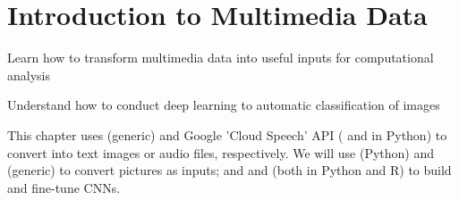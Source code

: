 \chapter{Introduction to Multimedia Data}
\label{chap:image}

\begin{abstract}{Abstract}
Digitally collected data often does not only contain texts, but also audio, images and videos. Instead of using only textual features as we did in previous chapters, we could as well use, for instance, pixel values
to analyse images. First, we will see how to use existing libraries, commercial services or API's to conduct multimedia analysis (i.e. optical character recognition, speech-to-text or object recognition). Then we will show how to store, represent and convert multimedia data in order to use it as an input in our computational analysis.  We will focus on image analysis using machine learning classification techniques based on deep learning, and will explain how to build (or fine-tune) a Convolutional Neural Network (CNN) by ourselves. 
\end{abstract}


\begin{objectives}
\item Learn how to transform multimedia data into useful inputs for computational analysis
\item Understand how to conduct deep learning to automatic classification of images
\end{objectives}

\begin{feature}
This chapter uses  (generic) and  Google 'Cloud Speech' API ( and  in Python) to convert into text images or audio files, respectively. We will use  (Python) and  (generic) to convert pictures as inputs; and  and  (both in Python and R) to build and fine-tune CNNs. 
\end{feature}






